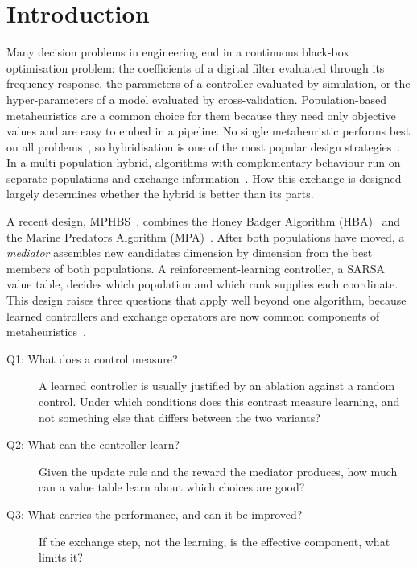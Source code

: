 \section{Introduction}
\label{sec:intro}

Many decision problems in engineering end in a continuous black-box optimisation problem: the coefficients of a digital
filter evaluated through its frequency response, the parameters of a controller evaluated by simulation, or the
hyper-parameters of a model evaluated by cross-validation. Population-based metaheuristics are a common choice for them
because they need only objective values and are easy to embed in a pipeline. No single metaheuristic performs best on all
problems~\citep{wolpert1997nfl}, so hybridisation is one of the most popular design strategies~\citep{talbi2002taxonomy,
blum2011hybrid}. In a multi-population hybrid, algorithms with complementary behaviour run on separate populations and
exchange information~\citep{alba2002parallel,ma2019multipop}. How this exchange is designed largely determines whether
the hybrid is better than its parts.

A recent design, MPHBS~\citep{flores2026mphbs}, combines the Honey Badger Algorithm (HBA)~\citep{hashim2022hba} and the
Marine Predators Algorithm (MPA)~\citep{faramarzi2020mpa}. After both populations have moved, a \emph{mediator} assembles
new candidates dimension by dimension from the best members of both populations. A reinforcement-learning controller,
a SARSA value table, decides which population and which rank supplies each coordinate. This design raises three questions
that apply well beyond one algorithm, because learned controllers and exchange operators are now common components of
metaheuristics~\citep{talbi2021ml,drugan2019rl,song2024rlea}.

\begin{description}
\item[Q1: What does a control measure?] A learned controller is usually justified by an ablation against a random control.
Under which conditions does this contrast measure learning, and not something else that differs between the two variants?
\item[Q2: What can the controller learn?] Given the update rule and the reward the mediator produces, how much can a value
table learn about which choices are good?
\item[Q3: What carries the performance, and can it be improved?] If the exchange step, not the learning, is the
effective component, what limits it?
\end{description}

